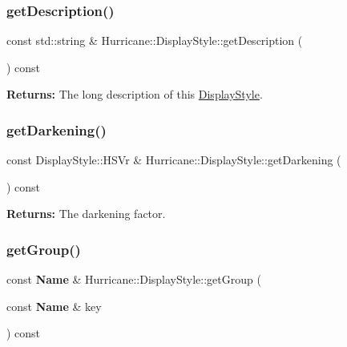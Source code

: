 \subsubsection{\texorpdfstring{get\+Description()}{getDescription()}}
{\footnotesize\ttfamily const std\+::string \& Hurricane\+::\+Display\+Style\+::get\+Description (\begin{DoxyParamCaption}{ }\end{DoxyParamCaption}) const\hspace{0.3cm}{\ttfamily [inline]}}

{\bfseries Returns\+:} The long description of this \hyperlink{classHurricane_1_1DisplayStyle}{Display\+Style}. \mbox{\label{classHurricane_1_1DisplayStyle_ab3e8eaedf1567526e5615addb525fc73}} 
\subsubsection{\texorpdfstring{get\+Darkening()}{getDarkening()}}
{\footnotesize\ttfamily const Display\+Style\+::\+H\+S\+Vr \& Hurricane\+::\+Display\+Style\+::get\+Darkening (\begin{DoxyParamCaption}{ }\end{DoxyParamCaption}) const\hspace{0.3cm}{\ttfamily [inline]}}

{\bfseries Returns\+:} The darkening factor. \mbox{\label{classHurricane_1_1DisplayStyle_af4efb49cf791189ba5f53fbbdd7c6675}} 
\subsubsection{\texorpdfstring{get\+Group()}{getGroup()}}
{\footnotesize\ttfamily const \textbf{ Name} \& Hurricane\+::\+Display\+Style\+::get\+Group (\begin{DoxyParamCaption}\item[{const \textbf{ Name} \&}]{key }\end{DoxyParamCaption}) const}

